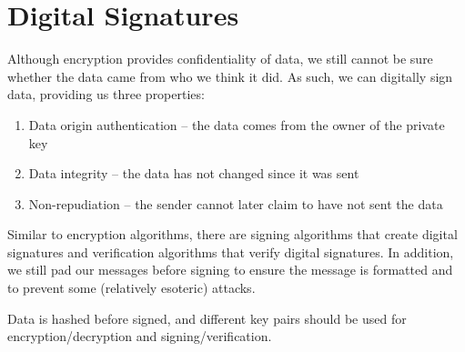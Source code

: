 \documentclass[12pt]{report}
\begin{document}
\section{Digital Signatures}
Although encryption provides confidentiality of data, we still cannot be sure whether the data came from who we think it did. As such, we can digitally sign data, providing us three properties:

\begin{enumerate}
    \item Data origin authentication -- the data comes from the owner of the private key
    \item Data integrity -- the data has not changed since it was sent
    \item Non-repudiation -- the sender cannot later claim to have not sent the data
\end{enumerate}

Similar to encryption algorithms, there are signing algorithms that create digital signatures and verification algorithms that verify digital signatures. In addition, we still pad our messages before signing to ensure the message is formatted and to prevent some (relatively esoteric) attacks.

Data is hashed before signed, and different key pairs should be used for encryption/decryption and signing/verification.

\amzindex
\end{document}
